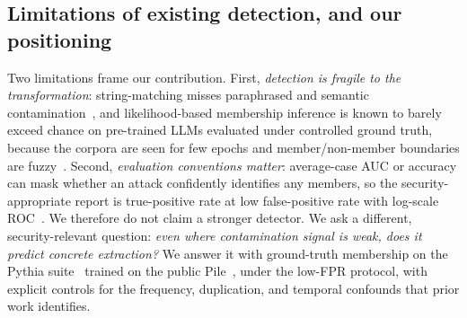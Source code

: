 \subsection{Limitations of existing detection, and our positioning}
Two limitations frame our contribution. First, \emph{detection is fragile to the
transformation}: string-matching misses paraphrased and semantic
contamination~\citep{ippolito2023verbatim}, and likelihood-based membership inference is
known to barely exceed chance on pre-trained LLMs evaluated under controlled ground
truth, because the corpora are seen for few epochs and member/non-member boundaries are
fuzzy~\citep{duan2024mia}. Second, \emph{evaluation conventions matter}: average-case
AUC or accuracy can mask whether an attack confidently identifies any members, so the
security-appropriate report is true-positive rate at low false-positive rate with
log-scale ROC~\citep{carlini2022lira}. We therefore do not claim a stronger detector.
We ask a different, security-relevant question: \emph{even where contamination signal
is weak, does it predict concrete extraction?} We answer it with ground-truth
membership on the Pythia suite~\citep{biderman2023pythia} trained on the public
Pile~\citep{gao2020pile}, under the low-FPR protocol, with explicit controls for the
frequency, duplication, and temporal confounds that prior work identifies.

